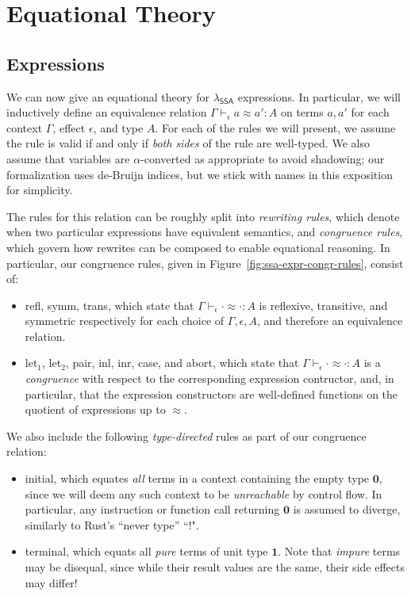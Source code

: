 \documentclass[acmsmall,screen,review]{acmart}
\newcommand{\mb}[1]{\ensuremath{\mathbf{#1}}}
\newcommand{\ms}[1]{\ensuremath{\mathsf{#1}}}
\newcommand{\teqv}{\approx}
\newcommand{\tmeq}[5]{#1 \vdash_{#2} #3 \teqv #4 : {#5}}
\newcommand{\brle}[1]{{\textsf{#1}}}
\newcommand{\isotopessa}{\(\lambda_{\ms{SSA}}\)}
\begin{document}
\section{Equational Theory}

\label{sec:equations}

\subsection{Expressions}

We can now give an equational theory for \isotopessa{} expressions. In particular,
we will inductively define an equivalence relation
$
\tmeq{\Gamma}{\epsilon}{a}{a'}{A}
$
on terms $a, a'$ for each context $\Gamma$, effect $\epsilon$, and type $A$. For each of the rules
we will present, we assume the rule is valid if and only if \emph{both sides} of the rule are
well-typed. We also assume that variables are $\alpha$-converted as appropriate to avoid shadowing;
our formalization uses de-Bruijn indices, but we stick with names in this exposition for simplicity.

The rules for this relation can be roughly split into \emph{rewriting rules}, which denote when two
particular expressions have equivalent semantics, and \emph{congruence rules}, which govern how
rewrites can be composed to enable equational reasoning. In particular, our congruence rules, given
in Figure~\ref{fig:ssa-expr-congr-rules}, consist of:
\begin{itemize}
  \item \brle{refl}, \brle{symm}, \brle{trans}, which state that
  $\tmeq{\Gamma}{\epsilon}{\cdot}{\cdot}{A}$ is reflexive, transitive, and symmetric respectively
  for each choice of $\Gamma, \epsilon, A$, and therefore an equivalence relation.
  \item \brle{let$_1$}, \brle{let$_2$}, \brle{pair}, \brle{inl}, \brle{inr}, \brle{case}, and
  \brle{abort}, which state that $\tmeq{\Gamma}{\epsilon}{\cdot}{\cdot}{A}$ is a \emph{congruence}
  with respect to the corresponding expression contructor, and, in particular, that the expression
  constructors are well-defined functions on the quotient of expressions up to $\teqv$.
\end{itemize} 
We also include the following \emph{type-directed} rules as part of our congruence relation:
\begin{itemize}
  \item \brle{initial}, which equates \emph{all} terms in a context containing the empty type
  $\mb{0}$, since we will deem any such context to be \emph{unreachable} by control flow. In
  particular, any instruction or function call returning $\mb{0}$ is assumed to diverge, similarly
  to Rust's ``never type'' ``$!$".
  \item \brle{terminal}, which equats all \emph{pure} terms of unit type $\mb{1}$. Note that
  \emph{impure} terms may be disequal, since while their result values are the same, their side
  effects may differ!
\end{itemize}
\end{document}
